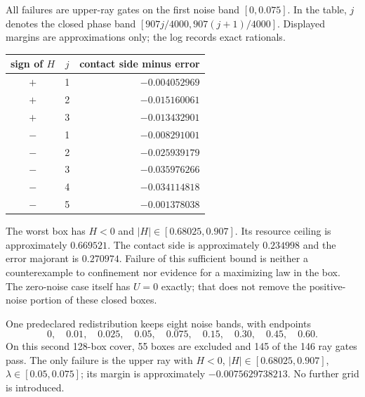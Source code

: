 \documentclass[11pt]{article}
\begin{document}
All failures are upper-ray gates on the first noise band $[0,0.075]$.
In the table, $j$ denotes the closed phase band
$[907j/4000,907(j+1)/4000]$. Displayed margins are approximations only;
the log records exact rationals.
\begin{center}
\begin{tabular}{ccr}\toprule
sign of $H$&$j$&contact side minus error\\\midrule
$+$&1&$-0.004052969$\\
$+$&2&$-0.015160061$\\
$+$&3&$-0.013432901$\\
$-$&1&$-0.008291001$\\
$-$&2&$-0.025939179$\\
$-$&3&$-0.035976266$\\
$-$&4&$-0.034114818$\\
$-$&5&$-0.001378038$\\\bottomrule
\end{tabular}
\end{center}
The worst box has $H<0$ and $|H|\in[0.68025,0.907]$.
Its resource ceiling is approximately $0.669521$. The contact side is
approximately $0.234998$ and the error majorant is $0.270974$.
Failure of this sufficient bound is neither a
counterexample to confinement nor evidence for a maximizing law in the box.
The zero-noise case itself has $U=0$ exactly; that does not remove the
positive-noise portion of these closed boxes.

One predeclared redistribution keeps eight noise bands, with endpoints
\[
 0,\quad0.01,\quad0.025,\quad0.05,\quad0.075,\quad
 0.15,\quad0.30,\quad0.45,\quad0.60.
\]
On this second 128-box cover, 55 boxes are excluded and 145 of the
146 ray gates pass. The only failure is the upper ray with $H<0$,
$|H|\in[0.68025,0.907]$, $\lambda\in[0.05,0.075]$; its margin is
approximately $-0.0075629738213$. No further grid is introduced.
\end{document}
